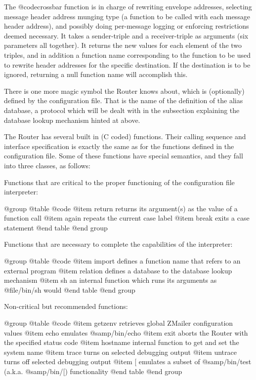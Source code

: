 {The @code{crossbar} function is in charge of rewriting envelope addresses,
selecting message header address munging type (a function to be called
with each message header address), and possibly doing per-message logging
or enforcing restrictions deemed necessary.
It takes a sender-triple and a receiver-triple as arguments (six parameters
all together).
It returns the new values for each element of the two triples, and in
addition a function name corresponding to the function to be used to
rewrite header addresses for the specific destination.
If the destination is to be ignored, returning a null function name will
accomplish this.

There is one more magic symbol the Router knows about, which is
(optionally) defined by the configuration file.
That is the name of the definition of the alias database, a protocol
which will be dealt with in the subsection explaining the database
lookup mechanism hinted at above.

The Router has several built in (C coded) functions.
Their calling sequence and interface specification is exactly the same
as for the functions defined in the configuration file.
Some of these functions have special semantics, and they fall into three
classes, as follows:

Functions that are critical to the proper functioning of the configuration
file interpreter:

@group
@table @code
@item return
returns its argument(s) as the value of a function call
@item again
repeats the current case label
@item break
exits a case statement
@end table
@end group

Functions that are necessary to complete the capabilities of the interpreter:

@group
@table @code
@item import
defines a function name that refers to an external program
@item relation
defines a database to the database lookup mechanism
@item sh
an internal function which runs its arguments as @file{/bin/sh} would
@end table
@end group

Non-critical but recommended functions:

@group
@table @code
@item getzenv
retrieves global ZMailer configuration values
@item echo
emulates @samp{/bin/echo}
@item exit
aborts the Router with the specified status code
@item hostname
internal function to get and set the system name
@item trace
turns on selected debugging output
@item untrace
turns off selected debugging output
@item [
emulates a subset of @samp{/bin/test} (a.k.a. @samp{/bin/[}) functionality
@end table
@end group

}
